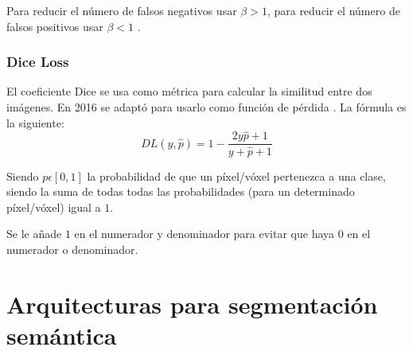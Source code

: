 Para reducir el número de falsos negativos usar $\beta > 1$, para reducir el número de falsos positivos usar $\beta < 1$ \cite{Jadon2020}.

\subsubsection{Dice Loss}

El coeficiente Dice se usa como métrica para calcular la similitud entre dos imágenes. En 2016 se adaptó para usarlo como función de pérdida \cite{Cardoso2017}. La fórmula es la siguiente:
\begin{equation}
DL(y,\hat{p})= 1 - \frac{2y\hat{p}+1}{y+\hat{p}+1}
\end{equation}

Siendo $p\epsilon[0,1]$ la probabilidad de que un píxel/vóxel pertenezca a una clase, siendo la suma de todas todas las probabilidades (para un determinado píxel/vóxel) igual a $1$.

Se le añade $1$ en el numerador y denominador para evitar que haya $0$ en el numerador o denominador.

\section{Arquitecturas para segmentación semántica}\label{sec:archs}

